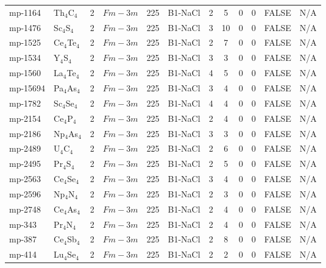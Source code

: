 {\begin{longtable}{llcccccccccc}
    mp-1164 & Th$_{4}$C$_{4}$ & 2     & $Fm-3m$ & 225   & B1-NaCl & 2     & 5     & 0     & 0     & FALSE & N/A \\
    mp-1476 & Sc$_{4}$S$_{4}$ & 2     & $Fm-3m$ & 225   & B1-NaCl & 3     & 10    & 0     & 0     & FALSE & N/A \\
    mp-1525 & Ce$_{4}$Te$_{4}$ & 2     & $Fm-3m$ & 225   & B1-NaCl & 2     & 7     & 0     & 0     & FALSE & N/A \\
    mp-1534 & Y$_{4}$S$_{4}$ & 2     & $Fm-3m$ & 225   & B1-NaCl & 3     & 3     & 0     & 0     & FALSE & N/A \\
    mp-1560 & La$_{4}$Te$_{4}$ & 2     & $Fm-3m$ & 225   & B1-NaCl & 4     & 5     & 0     & 0     & FALSE & N/A \\
    mp-15694 & Pa$_{4}$As$_{4}$ & 2     & $Fm-3m$ & 225   & B1-NaCl & 3     & 4     & 0     & 0     & FALSE & N/A \\
    mp-1782 & Sc$_{4}$Se$_{4}$ & 2     & $Fm-3m$ & 225   & B1-NaCl & 4     & 4     & 0     & 0     & FALSE & N/A \\
    mp-2154 & Ce$_{4}$P$_{4}$ & 2     & $Fm-3m$ & 225   & B1-NaCl & 2     & 4     & 0     & 0     & FALSE & N/A \\
    mp-2186 & Np$_{4}$As$_{4}$ & 2     & $Fm-3m$ & 225   & B1-NaCl & 3     & 3     & 0     & 0     & FALSE & N/A \\
    mp-2489 & U$_{4}$C$_{4}$ & 2     & $Fm-3m$ & 225   & B1-NaCl & 2     & 6     & 0     & 0     & FALSE & N/A \\
    mp-2495 & Pr$_{4}$S$_{4}$ & 2     & $Fm-3m$ & 225   & B1-NaCl & 2     & 5     & 0     & 0     & FALSE & N/A \\
    mp-2563 & Ce$_{4}$Se$_{4}$ & 2     & $Fm-3m$ & 225   & B1-NaCl & 3     & 4     & 0     & 0     & FALSE & N/A \\
    mp-2596 & Np$_{4}$N$_{4}$ & 2     & $Fm-3m$ & 225   & B1-NaCl & 2     & 3     & 0     & 0     & FALSE & N/A \\
    mp-2748 & Ce$_{4}$As$_{4}$ & 2     & $Fm-3m$ & 225   & B1-NaCl & 2     & 4     & 0     & 0     & FALSE & N/A \\
    mp-343 & Pr$_{4}$N$_{4}$ & 2     & $Fm-3m$ & 225   & B1-NaCl & 2     & 4     & 0     & 0     & FALSE & N/A \\
    mp-387 & Ce$_{4}$Sb$_{4}$ & 2     & $Fm-3m$ & 225   & B1-NaCl & 2     & 8     & 0     & 0     & FALSE & N/A \\
    mp-414 & Lu$_{4}$Se$_{4}$ & 2     & $Fm-3m$ & 225   & B1-NaCl & 2     & 2     & 0     & 0     & FALSE & N/A \\

\end{longtable}}
